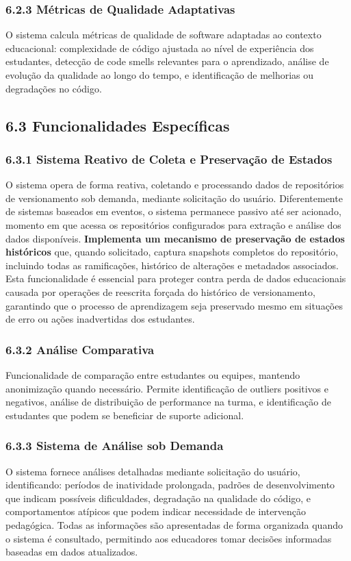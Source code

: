 \documentclass{patente}
\begin{document}
\subsubsection*{6.2.3 Métricas de Qualidade Adaptativas}
O sistema calcula métricas de qualidade de software adaptadas ao contexto educacional: complexidade de código ajustada ao nível de experiência dos estudantes, detecção de code smells relevantes para o aprendizado, análise de evolução da qualidade ao longo do tempo, e identificação de melhorias ou degradações no código.

\subsection*{6.3 Funcionalidades Específicas}

\subsubsection*{6.3.1 Sistema Reativo de Coleta e Preservação de Estados}
O sistema opera de forma reativa, coletando e processando dados de repositórios de versionamento sob demanda, mediante solicitação do usuário. Diferentemente de sistemas baseados em eventos, o sistema permanece passivo até ser acionado, momento em que acessa os repositórios configurados para extração e análise dos dados disponíveis. \textbf{Implementa um mecanismo de preservação de estados históricos} que, quando solicitado, captura snapshots completos do repositório, incluindo todas as ramificações, histórico de alterações e metadados associados. Esta funcionalidade é essencial para proteger contra perda de dados educacionais causada por operações de reescrita forçada do histórico de versionamento, garantindo que o processo de aprendizagem seja preservado mesmo em situações de erro ou ações inadvertidas dos estudantes.

\subsubsection*{6.3.2 Análise Comparativa}
Funcionalidade de comparação entre estudantes ou equipes, mantendo anonimização quando necessário. Permite identificação de outliers positivos e negativos, análise de distribuição de performance na turma, e identificação de estudantes que podem se beneficiar de suporte adicional.

\subsubsection*{6.3.3 Sistema de Análise sob Demanda}
O sistema fornece análises detalhadas mediante solicitação do usuário, identificando: períodos de inatividade prolongada, padrões de desenvolvimento que indicam possíveis dificuldades, degradação na qualidade do código, e comportamentos atípicos que podem indicar necessidade de intervenção pedagógica. Todas as informações são apresentadas de forma organizada quando o sistema é consultado, permitindo aos educadores tomar decisões informadas baseadas em dados atualizados.
\end{document}
